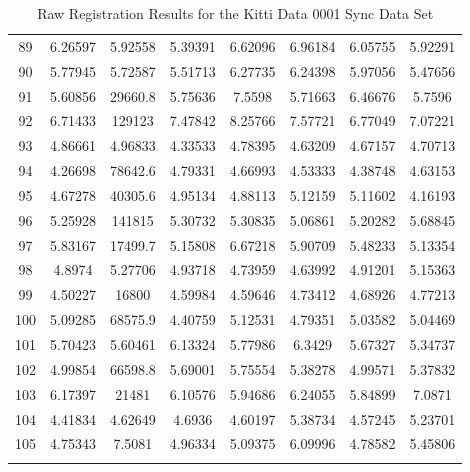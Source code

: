 \begin{center}
\begin{longtable}{cccccccc}
89 & 6.26597 & 5.92558 & 5.39391 & 6.62096 & 6.96184 & 6.05755 & 5.92291\\
90 & 5.77945 & 5.72587 & 5.51713 & 6.27735 & 6.24398 & 5.97056 & 5.47656\\
91 & 5.60856 & 29660.8 & 5.75636 & 7.5598 & 5.71663 & 6.46676 & 5.7596\\
92 & 6.71433 & 129123 & 7.47842 & 8.25766 & 7.57721 & 6.77049 & 7.07221\\
93 & 4.86661 & 4.96833 & 4.33533 & 4.78395 & 4.63209 & 4.67157 & 4.70713\\
94 & 4.26698 & 78642.6 & 4.79331 & 4.66993 & 4.53333 & 4.38748 & 4.63153\\
95 & 4.67278 & 40305.6 & 4.95134 & 4.88113 & 5.12159 & 5.11602 & 4.16193\\
96 & 5.25928 & 141815 & 5.30732 & 5.30835 & 5.06861 & 5.20282 & 5.68845\\
97 & 5.83167 & 17499.7 & 5.15808 & 6.67218 & 5.90709 & 5.48233 & 5.13354\\
98 & 4.8974 & 5.27706 & 4.93718 & 4.73959 & 4.63992 & 4.91201 & 5.15363\\
99 & 4.50227 & 16800 & 4.59984 & 4.59646 & 4.73412 & 4.68926 & 4.77213\\
100 & 5.09285 & 68575.9 & 4.40759 & 5.12531 & 4.79351 & 5.03582 & 5.04469\\
101 & 5.70423 & 5.60461 & 6.13324 & 5.77986 & 6.3429 & 5.67327 & 5.34737\\
102 & 4.99854 & 66598.8 & 5.69001 & 5.75554 & 5.38278 & 4.99571 & 5.37832\\
103 & 6.17397 & 21481 & 6.10576 & 5.94686 & 6.24055 & 5.84899 & 7.0871\\
104 & 4.41834 & 4.62649 & 4.6936 & 4.60197 & 5.38734 & 4.57245 & 5.23701\\
105 & 4.75343 & 7.5081 & 4.96334 & 5.09375 & 6.09996 & 4.78582 & 5.45806\\
\caption{Raw Registration Results for the Kitti Data 0001 Sync Data Set}
\label{tab:kittidata0001syncFULL}
\end{longtable}
\end{center}


